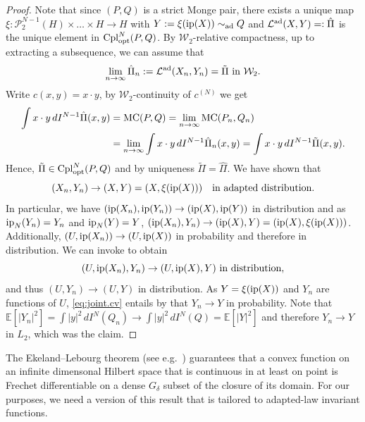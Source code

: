 \documentclass[a4paper]{amsart}
\numberwithin{theorem}{section}
\theoremstyle{definition}
\newcommand{\E}{\mathbb{E}}
\newcommand{\law}{\mathcal{L}}
\newcommand{\cpl}{\textup{Cpl}}
\newcommand{\W}{\mathcal{W}}
\newcommand{\Pc}{\mathcal P}
\newcommand{\cplopt}{\cpl_{\rm opt}}
\newcommand{\simad}{\sim_{\mathrm{ad}}}
\renewcommand{\H}{H}
\newcommand{\mc}{\textup{MC}}
\newcommand{\ip}{\textup{ip}}
\newcommand{\lawad}{\law^{\textup{ad}}}
\begin{document}
\begin{proof}
    Note that since $(P,Q)$ is a strict Monge pair, there exists a unique map $\xi : \Pc^{N-1}_2(\H) \times \dots \times \H \to \H$ with $Y := \xi(\ip(X)) \simad Q$ and $\lawad(X,Y) =: \hat \Pi$ is the unique element in $\cplopt^N(P,Q)$.
    By $\W_2$-relative compactness, up to extracting a subsequence, we can assume that
    \[
        \lim_{n \to \infty} \hat \Pi_n := \lawad(X_n,Y_n) = \tilde \Pi \text{ in }\W_2.
    \]
    Write $c(x,y) = x \cdot y$, by $\W_2$-continuity of $c^{(N)}$ we get
    \begin{align*}
        \int x \cdot y \, dI^{N-1}\hat \Pi(x,y) &= \mc(P,Q) =
        \lim_{n \to \infty}\mc(P_n,Q_n)
        \\
        &= \lim_{n \to \infty} \int x \cdot y \, d I^{N-1} \hat \Pi_n(x,y) = \int x \cdot y \, dI^{N-1}\tilde \Pi(x,y).
    \end{align*}
    Hence, $\tilde \Pi \in \cplopt^N(P,Q)$ and by uniqueness $\tilde \Pi = \hat \Pi$. We have shown that
    \[
        (X_n,Y_n) \to (X,Y) = (X,\xi(\ip(X))) \quad \text{in adapted distribution}.
    \]
    In particular, we have $(\ip(X_n),\ip(Y_n)) \to (\ip(X),\ip(Y))$ in distribution and as $\ip_N(Y_n) = Y_n$ and $\ip_N(Y) = Y$,
    $(\ip(X_n),Y_n) \to (\ip(X),Y) = (\ip(X), \xi(\ip(X)))$.
    Additionally, $(U,\ip(X_n)) \to (U,\ip(X))$ in probability and therefore in distribution. 
    We can invoke \cite[Lemma 6.4]{BePaScZh23} to obtain
    \begin{equation}
        \label{eq:joint.cv}
        (U,\ip(X_n),Y_n) \to 
        (U,\ip(X),Y) \text{ in distribution},
    \end{equation}
    and thus $(U,Y_n) \to (U,Y)$ in distribution.
    As $Y = \xi(\ip(X))$ and $Y_n$ are functions of $U$, \eqref{eq:joint.cv} entails by \cite[Lemma 3.14]{JoPa24} that $Y_n \to Y$ in probability.
    Note that $\E[|Y_n|^2] = \int |y|^2 \, dI^N(Q_n) \to \int |y|^2 \, dI^N(Q) = \E[|Y|^2]$ and therefore $Y_n \to Y$ in $L_2$, which was the claim.
\end{proof}






The Ekeland--Lebourg theorem (see e.g.\ \cite[Theorem 18.3]{BaCo17}) guarantees that a convex function on an infinite dimensonal Hilbert space that is continuous in at least on point is Frechet differentiable on a dense $G_\delta$ subset of the closure of its domain. For our purposes, we need a version of this result that is tailored to adapted-law invariant functions. 
\end{document}
